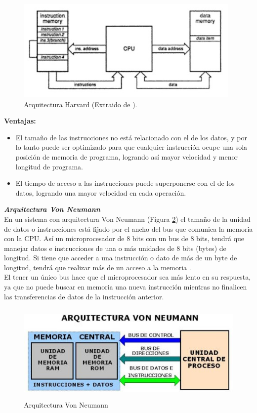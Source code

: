 \documentclass[12pt,a4paper]{article}
\begin{document}
   \begin{figure}[h]
   \centering
   \includegraphics[height=5cm]{Harvard}
   \caption{Arquitectura Harvard (Extraido de \cite{Muha}).}
   \label{fig:ArqHarvard}
   \end{figure}
   
   
   \textbf{Ventajas:}
   \begin{itemize}
   	\item El tamaño de las instrucciones no está relacionado con el de los datos, y por lo tanto puede ser optimizado para que cualquier instrucción ocupe una sola posición de memoria de programa, logrando así mayor velocidad y menor longitud de programa.
   	\item El tiempo de acceso a las instrucciones puede superponerse con el de los datos, logrando una mayor velocidad en cada operación.
   \end{itemize}
   
   \textbf{\textit{Arquitectura Von Neumann}}\\
   En un sistema con arquitectura Von Neumann (Figura \ref{fig:VonNeumann}) el tamaño de la unidad de datos o instrucciones está fijado por el ancho del bus que comunica la memoria con la CPU. Así un microprocesador de 8 bits con un bus de 8 bits, tendrá que manejar datos e instrucciones de una o más unidades de 8 bits (bytes) de longitud. Si tiene que acceder a una instrucción o dato de más de un byte de longitud, tendrá que realizar más de un acceso a la memoria \cite{Camacho}. \\
   El tener un único bus hace que el microprocesador sea más lento en su respuesta, ya que no puede buscar en memoria una nueva instrucción mientras no finalicen las transferencias de datos de la instrucción anterior.
   
   \begin{figure}[htpb]
   \centering
   \includegraphics[height=4.8cm]{VonNeumann}
   \caption{Arquitectura Von Neumann}
   \label{fig:VonNeumann}
   \end{figure}
    
\end{document}
